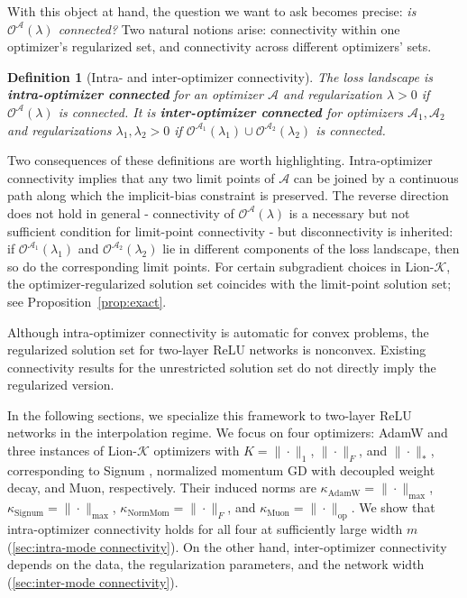 \documentclass{article}
\newtheorem{definition}{Definition}[section]
\begin{document}
With this object at hand, the question we want to ask becomes precise: \emph{is $\mathcal{O}^\mathcal{A}(\lambda)$ connected?} Two natural notions arise: connectivity within one optimizer's regularized set, and connectivity across different optimizers' sets.
\begin{definition}[Intra- and inter-optimizer connectivity]
The loss landscape is \textbf{intra-optimizer connected} for an optimizer $\mathcal{A}$ and regularization $\lambda > 0$ if $\mathcal{O}^\mathcal{A}(\lambda)$ is connected. It is \textbf{inter-optimizer connected} for optimizers $\mathcal{A}_1, \mathcal{A}_2$ and regularizations $\lambda_1, \lambda_2 > 0$ if $\mathcal{O}^{\mathcal{A}_1}(\lambda_1) \cup \mathcal{O}^{\mathcal{A}_2}(\lambda_2)$ is connected.  
\end{definition}
Two consequences of these definitions are worth highlighting. Intra-optimizer connectivity implies that any two limit points of $\mathcal{A}$ can be joined by a continuous path along which the implicit-bias constraint is preserved. The reverse direction does not hold in general - connectivity of $\mathcal{O}^\mathcal{A}(\lambda)$ is a necessary but not sufficient condition for limit-point connectivity - but disconnectivity is inherited: if $\mathcal{O}^{\mathcal{A}_1}(\lambda_1)$ and $\mathcal{O}^{\mathcal{A}_2}(\lambda_2)$ lie in different components of the loss landscape, then so do the corresponding limit points. For certain subgradient choices in Lion-$\mathcal{K}$, the optimizer-regularized solution set coincides with the limit-point solution set; see Proposition~\ref{prop:exact}.

Although intra-optimizer connectivity is automatic for convex problems, the regularized solution set for two-layer ReLU networks is nonconvex. Existing connectivity results for the unrestricted solution set \citep{freeman2017topologygeometryhalfrectifiednetwork,nguyen2021note} do not directly imply the regularized version.

In the following sections, we specialize this framework to two-layer ReLU networks in the interpolation regime. We focus on four optimizers: AdamW and three instances of Lion-$\mathcal{K}$ optimizers with $K = \|\cdot\|_1$, $\|\cdot\|_F$, and $\|\cdot\|_*$, corresponding to Signum \citep{bernstein2018signsgd}, normalized momentum GD  \citep{cutkosky2020momentum} with decoupled weight decay, and Muon, respectively. Their induced norms are $\kappa_{\mathrm{AdamW}} = \|\cdot\|_{\max}$, $\kappa_{\mathrm{Signum}} = \|\cdot\|_{\max}$, $\kappa_{\mathrm{NormMom}} = \|\cdot\|_F$, and $\kappa_{\mathrm{Muon}} = \|\cdot\|_{\mathrm{op}}$. We show that intra-optimizer connectivity holds for all four at sufficiently large width $m$ (\cref{sec:intra-mode connectivity}). On the other hand, inter-optimizer connectivity depends on the data, the regularization parameters, and the network width (\cref{sec:inter-mode connectivity}). 
\end{document}
